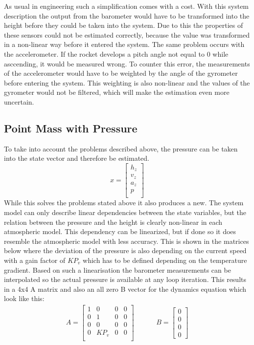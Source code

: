   As usual in engineering such a simplification comes with a cost. With this system description the output from the barometer would have
  to be transformed into the height before they could be taken into the system.
  Due to this the properties of these sensors could not be estimated correctly, because the value was transformed in a non-linear way before it entered the system.
  The same problem occurs with the accelerometer. If the rocket develops a pitch angle not equal to 0 while asccending, it would be measured wrong.
  To counter this error, the measurements of the accelerometer would have to be weighted by the angle of the gyrometer before entering the system.
  This weighting is also non-linear and the values of the gyrometer would not be filtered, which will make the estimation even more uncertain.

  \subsection{Point Mass with Pressure}
  To take into account the problems described above, the pressure can be taken into the state vector and therefore be estimated.
  $$ x = \begin{bmatrix}
  h_z\\
  v_z\\
  a_z\\
  p\\
  \end{bmatrix} $$
  While this solves the problems stated above it also produces a new. The system model can only describe linear dependencies between the state variables,
  but the relation between the pressure and the height is clearly non-linear in each atmospheric model.
  This dependency can be linearized, but if done so it does resemble the atmospheric model with less accuracy.
  This is shown in the matrices below where the deviation of the pressure is also depending on the current speed with a gain factor of $KP_v$ which has to be defined depending on the temperature gradient.
  Based on such a linearisation the barometer measurements can be interpolated so the actual pressure is available at any loop iteration.
  This results in a 4x4 A matrix and also an all zero B vector for the dynamics equation which look like this:
  \begin{align*}
  A = \begin{bmatrix}
         1    & 0 & 0 & 0    \\
         0    & 1 & 0 & 0    \\
         0    & 0 & 0 & 0    \\
         0    & KP_v & 0 & 0\\
        \end{bmatrix}
        & \hspace{1cm}
    B = \begin{bmatrix}
       0 \\
       0 \\
       0 \\
       0
      \end{bmatrix}
  \end{align*}

